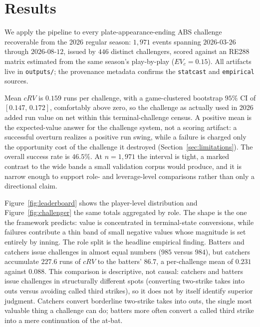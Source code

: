 \section{Results}
\label{sec:results}
We apply the pipeline to every plate-appearance-ending ABS challenge
recoverable from the 2026 regular season: $1{,}971$ events spanning
$2026$-$03$-$26$ through $2026$-$08$-$12$,
issued by $446$ distinct challengers, scored against an RE288 matrix estimated
from the same season's play-by-play ($EV_c = 0.15$). All artifacts live in
\texttt{outputs/}; the provenance metadata confirms the \texttt{statcast} and
\texttt{empirical} sources.



Mean $cRV$ is $0.159$ runs per challenge, with a game-clustered bootstrap
$95\%$ CI of $[0.147,\,0.172]$, comfortably above zero, so the challenge as
actually used in 2026 added run value on net within this terminal-challenge
census. A positive mean is the expected-value answer for the challenge system,
not a scoring artifact: a successful overturn realizes a positive run swing,
while a failure is charged only the opportunity cost of the challenge it
destroyed (Section~\ref{sec:limitations}). The overall success rate is
$46.5\%$. At $n = 1{,}971$ the interval is tight, a marked contrast to the wide
bands a small validation corpus would produce, and it is narrow enough to
support role- and leverage-level comparisons rather than only a directional
claim.





Figure~\ref{fig:leaderboard} shows the player-level distribution and
Figure~\ref{fig:challenger} the same totals aggregated by role. The shape is the
one the framework predicts: value is concentrated in terminal-state conversions,
while failures contribute a thin band of small negative values whose magnitude
is set entirely by inning. The role split is the headline empirical finding.
Batters and catchers issue challenges in almost equal numbers ($985$ versus
$984$), but catchers accumulate $227.6$ runs of $cRV$ to the batters' $86.7$, a
per-challenge mean of $0.231$ against $0.088$. This comparison is
descriptive, not causal: catchers and batters issue challenges in structurally
different spots (converting two-strike takes into outs versus avoiding called
third strikes), so it does not by itself identify superior judgment. Catchers
convert borderline two-strike takes into outs, the single most valuable thing a
challenge can do; batters more often convert a called third strike into a mere
continuation of the at-bat.

